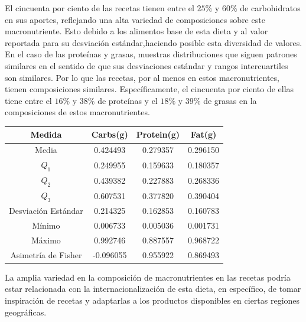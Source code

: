 \documentclass[12pt,a4paper]{article}
\begin{document}
            El cincuenta por ciento de las recetas tienen entre el $25\%$ y $60\%$ 
            de carbohidratos en sus aportes, reflejando una alta variedad de composiciones 
            sobre este macronutriente. Esto debido a los alimentos base de esta dieta y 
            al valor reportada para su desviación estándar,haciendo posible esta 
            diversidad de valores.\\

            En el caso de las proteínas y grasas, muestras distribuciones que siguen 
            patrones similares en el sentido de que sus desviaciones estándar y rangos 
            intercuartiles son similares. Por lo que las recetas, por al menos en estos 
            macronutrientes, tienen composiciones similares. Específicamente, el cincuenta 
            por ciento de ellas tiene entre el $16\%$ y $38\%$ de proteínas	y el $18\%$ y 
            $39\%$ de grasas en la composiciones de estos macronutrientes.

            \begin{center}
                \begin{tabular}{| c | c c c |}
                    \toprule
                    Medida & Carbs(g) & Protein(g) & Fat(g) \\
                    \midrule
                    Media               & 0.424493 & 0.279357 & 0.296150  \\
                    $Q_1$               & 0.249955 & 0.159633 & 0.180357  \\
                    $Q_2$               & 0.439382 & 0.227883 & 0.268336  \\
                    $Q_3$               & 0.607531 & 0.377820 & 0.390404  \\
                    Desviación Estándar & 0.214325 & 0.162853 & 0.160783  \\
                    Mínimo              & 0.006733 & 0.005036 & 0.001731  \\
                    Máximo              & 0.992746 & 0.887557 & 0.968722  \\
                    Asimetría de Fisher & -0.096055 & 0.955922 & 0.869493 \\
                    \bottomrule
                \end{tabular}
            \end{center}

            La amplia variedad en la composición de macronutrientes en las recetas podría 
            estar relacionada con la internacionalización de esta dieta, en específico, de 
            tomar inspiración de recetas y adaptarlas a los productos disponibles en 
            ciertas regiones geográficas.\\
\end{document}

